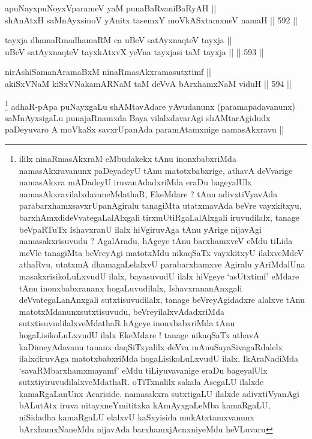 \begin{shl}
apuNayxpuNoyxVparameV yaM punaBaRvaniBaRyAH || \\
shAnAtxH saMnAyxsinoV yAnitx tasemxY moVkASxtamxneV namaH ||  592 ||  
\end{shl}


\begin{shl}
tayxja dhamaRmadhamaRM ca uBeV satAyxnaqteV tayxja || \\
uBeV satAyxnaqteV tayxkAtxvX yeVna tayxjasi taM tayxja ||  ||  593 ||  
\end{shl}


\begin{shl}
nirAshiSamanAramaBxM ninaRmasAkxramasutxtimf || \\
akiSxVNaM kiSxVNakamARNaM taM deVvA bArxhamxNaM viduH ||  594 ||  
\end{shl}

\begin{artha}
\footnote{ililx ninaRmasAkxraM eMbudakekx tAnu inonxbabxriMda
  namasAkxravanunx paDeyadeyU tAnu matotxbabxrige, athavA deVvarige
  namasAkxra mADadeyU iruvanAdadxriMda eraDu bageyalUlx
  namasAkxravilalxdavaneMdathaR, EkeMdare ? tAnu adivxtiVyavAda
  parabarxhamxsavxrUpanAgiralu tanagiMta utatxmavAda beVre vayxkitxyu,
  barxhAmxdideVvategaLalAlxgali tirxmUtiRgaLalAlxgali iruvudilalx,
  tanage beVpaRTuTx IshavxranU ilalx hiVgiruvAga tAnu yArige nijavAgi
  namasakxrisuvudu ? AgalAradu, hAgeye tAnu barxhamxveV eMdu tiLida
  meVle tanagiMta beVreyAgi matotxMdu nikaqSaTx vayxkitxyU ilalxveMdeV
  athaRvu, utatxmA dhamagaLelalxvU parabarxhamxve Agiralu yAriMdalUna
  masakxrisikoLuLxvudU ilalx, bayasuvudU ilalx hiVgeye `asUtxtimf'
  eMdare tAnu inonxbabxrananx hogaLuvudilalx, IshavxrananAnxgali
  deVvategaLanAnxgali sutxtisuvudilalx, tanage beVreyAgidadxre alalxve
  tAnu matotxMdanunxsutxtisuvudu, beVreyilalxvAdadxriMda
  sutxtisuvudilalxveMdathaR hAgeye inonxbabxriMda tAnu
  hogaLisikoLuLxvudU ilalx EkeMdare ! tanage nikaqSaTx athavA
  kaDimeyAdavanu tananx daqSiTxyalilx deVva mAnuSayaSivagaRdalelx
  ilalxdiruvAga matotxbabxriMda hogaLisikoLuLxvudU ilalx, IkAraNadiMda
  `savaRMbarxhamxmayamf' eMdu tiLiyuvavanige eraDu bageyalUlx
  sutxtiyiruvudilalxveMdathaR. oTiTxnalilx sakala AsegaLU ilalxde
  kamaRgaLanUnx Acariside. namasakxra sutxtigaLU ilalxde
  adivxtiVyanAgi bALutAtx iruva nitayxneYmititxka kAmAyxgaLeMba
  kamaRgaLU, niSidadha kamaRgaLU elalxvU kaSxyisida mukAtxtamxvanunx
  bArxhamxNaneMdu nijavAda barxhamxjAcnxniyeMdu heVLuvaru} adhaR-pApa puNayxgaLu shAMtavAdare yAvudanunx
(paramapadavanunx) saMnAyxsigaLu punajaRnamxda Baya vilalxdavarAgi
shAMtarAgidudx paDeyuvaro A moVkaSx savxrUpanAda paramAtamxnige
namasAkxravu ||
\end{artha}

